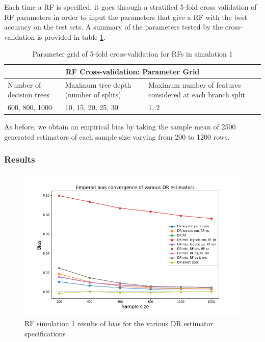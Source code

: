 \documentclass[12pt,twoside]{article}
\begin{document}
Each time a RF is specified, it goes through a stratified 5-fold cross validation of RF parameters in order to input the parameters that give a RF with the best accuracy on the test sets. A summary of the parameters tested by the cross-validation is provided in table \ref{tableRF}.\\
\begin{table}[]
    \centering
\begin{tabular}{ |p{3cm}|p{3cm}|p{3cm}| }
 \hline
 \multicolumn{3}{|c|}{RF Cross-validation: Parameter Grid} \\
 \hline
 Number of decision trees & Maximum tree depth (number of splits)  & Maximum    number of features considered at each branch split\\
 \hline
 600, 800, 1000& 10, 15, 20, 25, 30 & 1, 2 \\
 \hline 
\end{tabular}
\caption{Parameter grid of 5-fold cross-validation for RFs in simulation 1}
\label{tableRF}
\end{table}

As before, we obtain an empirical bias by taking the sample mean of 2500 generated estimators of each sample size varying from 200 to 1200 rows. 

\subsubsection*{Results}

\begin{figure}[h!]
    \centering
    \includegraphics[width = 0.9\columnwidth]{figures/biasRF.png}
    \caption{RF simulation 1 results of bias for the various DR estimator specifications}
    \label{figbiasRF}
\end{figure}
\end{document}
